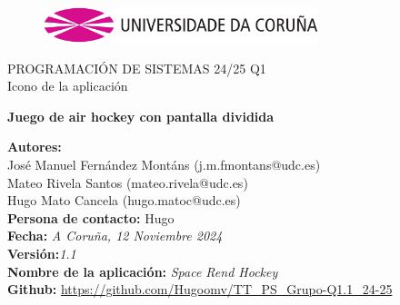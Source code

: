 \documentclass[a4paper,openright,12pt]{article}
\begin{document}
\begin{titlepage}

\begin{center}
\vspace*{-1in}
\begin{figure}[htb]
\begin{center}
\includegraphics[width=8cm]{udc.eps}
\end{center}
\end{figure}

\vspace*{1in}
PROGRAMACIÓN DE SISTEMAS 24/25 Q1\\
Icono de la aplicación\\
\vspace*{1in}
\begin{Large}
\textbf{Juego de air hockey con pantalla dividida} \\
\end{Large}

\vspace*{3in}

\begin{large}
\raggedleft
\textbf{Autores:}\\ José Manuel Fernández Montáns (j.m.fmontans@udc.es) \\
Mateo Rivela Santos (mateo.rivela@udc.es)\\
Hugo Mato Cancela (hugo.matoc@udc.es)\\
\textbf{Persona de contacto:} Hugo\\
\textbf{Fecha:}\textit{ A Coruña, 12 Noviembre 2024}\\
\textbf{Versión:}\textit{1.1}\\
\textbf{Nombre de la aplicación:} \textit{Space Rend Hockey}\\
\textbf{Github:} \url{https://github.com/Hugoomv/TT_PS_Grupo-Q1.1_24-25}\\
\end{large}

\end{center}
\end{titlepage} 

\newpage

\end{document}
